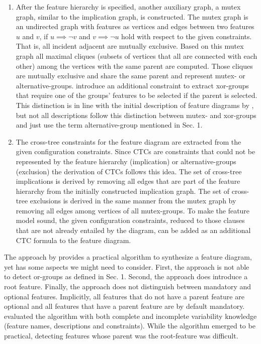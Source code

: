 \begin{enumerate}
  \item After the feature hierarchy is specified, another auxiliary graph, a
  mutex graph, similar to the implication graph, is constructed. The mutex
  graph is an undirected graph with features as vertices and edges between two
  features $u$ and $v$, if $u \implies \neg{v}$ and $v \implies \neg{u}$ hold
  with respect to the given constraints. That is, all incident adjacent are mutually exclusive. Based on
  this mutex graph all maximal cliques (subsets of vertices that all are
  connected with each other) among the vertices with the same parent are
  computed. Those cliques are mutually exclusive and share the same parent and
  represent mutex- or alternative-groups. \cite{she_reverse_2011} introduce an
  additional constraint to extract xor-groups that require one of the groups’
  features to be selected if the parent is selected. This distinction is in
  line with the initial description of feature diagrams by \cite{kang_feature-oriented_1990},
  but not all descriptions follow this distinction between mutex- and
  xor-groups and just use the term alternative-group mentioned in Sec. 1.
  
  \item The cross-tree constraints for the feature diagram are extracted from
  the given configuration constraints. Since CTCs are constraints that could
  not be represented by the feature hierarchy (implication) or
  alternative-groups (exclusion) the derivation of CTCs follows this idea. The
  set of cross-tree implications is derived by removing all edges that are part
  of the feature hierarchy from the initially constructed implication graph.
  The set of cross-tree exclusions is derived in the same manner from the mutex
  graph by removing all edges among vertices of all mutex-groups. To make the
  feature model sound, the given configuration constraints, reduced to those
  clauses that are not already entailed by the diagram, can be added as an
  additional CTC formula to the feature diagram.
\end{enumerate}

The approach by \cite{she_reverse_2011} provides a practical algorithm to synthesize a
feature diagram, yet has some aspects we might need to consider. First, the
approach is not able to detect or-groups as defined in Sec. 1. Second, the
approach does introduce a root feature. Finally, the approach does not
distinguish between mandatory and optional features. Implicitly, all features
that do not have a parent feature are optional and all features that have a
parent feature are by default mandatory. \cite{she_reverse_2011} evaluated the
algorithm with both complete and incomplete variability knowledge (feature
names, descriptions and constraints). While the algorithm emerged to be
practical, detecting features whose parent was the root-feature was difficult.

